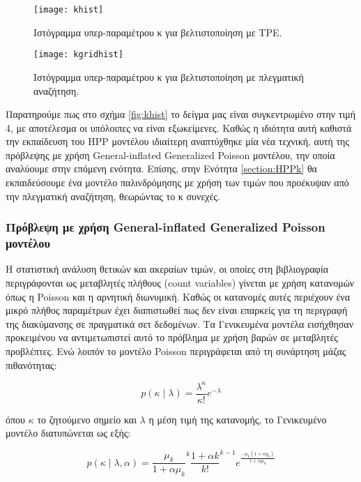 \begin{figure}
	\begin{minipage}{0.48\textwidth}
	\texttt{[image: khist]}
	\caption{Ιστόγραμμα υπερ-παραμέτρου κ για βελτιστοποίηση με \gls{TPE}.}	
	\label{fig:khist}
\end{minipage}
	\begin{minipage}{0.48\textwidth}
		\texttt{[image: kgridhist]}
		\caption{Ιστόγραμμα υπερ-παραμέτρου κ για βελτιστοποίηση με πλεγματική αναζήτηση.}	
		\label{fig:kgridhist}
	\end{minipage}
\end{figure}

Παρατηρούμε πως στο σχήμα \ref{fig:khist} το δείγμα μας είναι συγκεντρωμένο στην τιμή 4, με αποτέλεσμα οι υπόλοιπες να είναι εξωκείμενες. Καθώς η ιδιότητα αυτή καθιστά την εκπαίδευση του \gls{HPP} μοντέλου ιδιαίτερη αναπτύχθηκε μία νέα τεχνική, αυτή της πρόβλεψης με χρήση General-inflated Generalized Poisson μοντέλου, την οποία αναλύουμε στην επόμενη ενότητα. Επίσης, στην Ενότητα \ref{section:HPPk} θα εκπαιδεύσουμε ένα μοντέλο παλινδρόμησης με χρήση των τιμών που προέκυψαν από την πλεγματική αναζήτηση, θεωρώντας το κ συνεχές. 

\subsubsection{Πρόβλεψη με χρήση General-inflated Generalized Poisson μοντέλου} \label{section:GIGP}
Η στατιστική ανάλυση θετικών και ακεραίων τιμών, οι οποίες στη βιβλιογραφία περιγράφονται ως μεταβλητές πλήθους (count variables) γίνεται με χρήση κατανομών όπως η Poisson και η αρνητική διωνυμική. Καθώς οι κατανομές αυτές περιέχουν ένα μικρό πλήθος παραμέτρων έχει διαπιστωθεί πως δεν είναι επαρκείς για τη περιγραφή της διακύμανσης σε πραγματικά σετ δεδομένων. Τα Γενικευμένα μοντέλα \citep{Neld:Wedd:1972} εισήχθησαν προκειμένου να αντιμετωπιστεί αυτό το πρόβλημα με χρήση βαρών σε μεταβλητές προβλέπτες. Ενώ λοιπόν το μοντέλο Poisson περιγράφεται από τη συνάρτηση μάζας πιθανότητας:

\begin{equation}
 p(\kappa \mid \lambda) = \frac{\lambda^\kappa}{\kappa!} e^{-\lambda}
 \label{eq:poisson}
\end{equation}   

όπου $\kappa$ το ζητούμενο σημείο και $\lambda$ η μέση τιμή της κατανομής, το Γενικευμένο μοντέλο διατυπώνεται ως εξής:

\begin{equation}
 p(\kappa \mid \lambda, \alpha) = \frac{\mu_k}{1+\alpha \mu_k} ^k \frac{1+\alpha k}{k!}^{k-1} e^{\frac{-\mu_k(1+\alpha y_k)}{1+\alpha \mu_k}}
 \label{eq:gpoisson}
\end{equation}

